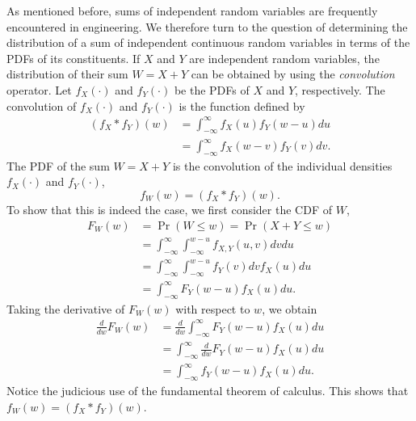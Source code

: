 As mentioned before, sums of independent random variables are frequently encountered in engineering.
We therefore turn to the question of determining the distribution of a sum of independent continuous random variables in terms of the PDFs of its constituents.
If $X$ and $Y$ are independent random variables, the distribution of their sum $W = X + Y$ can be obtained by using the \emph{convolution} operator. 
Let $f_X (\cdot)$ and $f_Y (\cdot)$ be the PDFs of $X$ and $Y$, respectively.
The convolution of $f_X(\cdot)$ and $f_Y(\cdot)$ is the function defined by
\begin{equation*}
\begin{split}
(f_X \ast f_Y) (w)
&= \int_{-\infty}^{\infty} f_X(u) f_Y(w - u) du \\
&= \int_{-\infty}^{\infty} f_X(w - v) f_Y(v) dv .
\end{split}
\end{equation*}
The PDF of the sum $W = X + Y$ is the convolution of the individual densities $f_X(\cdot)$ and $f_Y(\cdot)$,
\begin{equation*}
f_W (w) = (f_X \ast f_Y) (w) .
\end{equation*}
To show that this is indeed the case, we first consider the CDF of $W$,
\begin{equation*}
\begin{split}
F_W (w) &= \Pr (W \leq w) = \Pr (X + Y \leq w) \\
&= \int_{-\infty}^{\infty} \int_{-\infty}^{w - u} f_{X,Y} (u, v) dv du \\
&= \int_{-\infty}^{\infty} \int_{-\infty}^{w - u} f_Y (v) dv f_X (u) du \\
&= \int_{-\infty}^{\infty} F_Y (w - u) f_X(u) du .
\end{split}
\end{equation*}
Taking the derivative of $F_W (w)$ with respect to $w$, we obtain
\begin{equation*}
\begin{split}
\frac{d}{dw} F_W (w)
&= \frac{d}{dw} \int_{-\infty}^{\infty} F_Y (w - u) f_X(u) du \\
&= \int_{-\infty}^{\infty} \frac{d}{dw} F_Y (w - u) f_X(u) du \\
&= \int_{-\infty}^{\infty} f_Y (w - u) f_X(u) du .
\end{split}
\end{equation*}
Notice the judicious use of the fundamental theorem of calculus.
This shows that $f_W(w) = (f_X \ast f_Y) (w)$.

